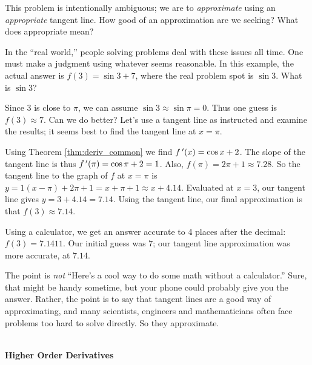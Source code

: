 {This problem is intentionally ambiguous; we are to \textit{approximate} using an \textit{appropriate} tangent line. How good of an approximation are we seeking? What does appropriate mean?

In the ``real world,'' people solving problems deal with these issues all time. One must make a judgment using whatever seems reasonable. In this example, the actual answer is $f(3) = \sin 3 + 7$, where the real problem spot is $\sin 3$. What is $\sin 3$?

Since $3$ is close to $\pi$, we can assume $\sin 3\approx \sin \pi = 0$. Thus one guess is $f(3) \approx 7$. Can we do better? Let's use a tangent line as instructed and examine the results; it seems best to find the tangent line at $x=\pi$. 

Using Theorem \ref{thm:deriv_common} we find $f\,'(x) = \cos x + 2$. The slope of the tangent line is thus $f\,'(\pi) = \cos \pi + 2 =1$. Also, $f(\pi) = 2\pi+1 \approx 7.28$. So the tangent line to the graph of $f$ at $x=\pi$ is $y=1(x-\pi)+ 2\pi+1 =x+\pi+1 \approx x+4.14$. Evaluated at $x=3$, our tangent line gives $y=3+4.14 = 7.14$. Using the tangent line, our final approximation is that $f(3) \approx 7.14$.

Using a calculator, we get an answer accurate to 4 places after the decimal: $f(3) = 7.1411$. Our initial guess was $7$; our tangent line approximation was more accurate, at $7.14$.

The point is \textit{not} ``Here's a cool way to do some math without a calculator.'' Sure, that might be handy sometime, but your phone could probably give you the answer. Rather, the point is to say that tangent lines are a good way of approximating, and many scientists, engineers and mathematicians often face problems too hard to solve directly. So they approximate.
}\\

\noindent\textbf{\large Higher Order Derivatives}\\

